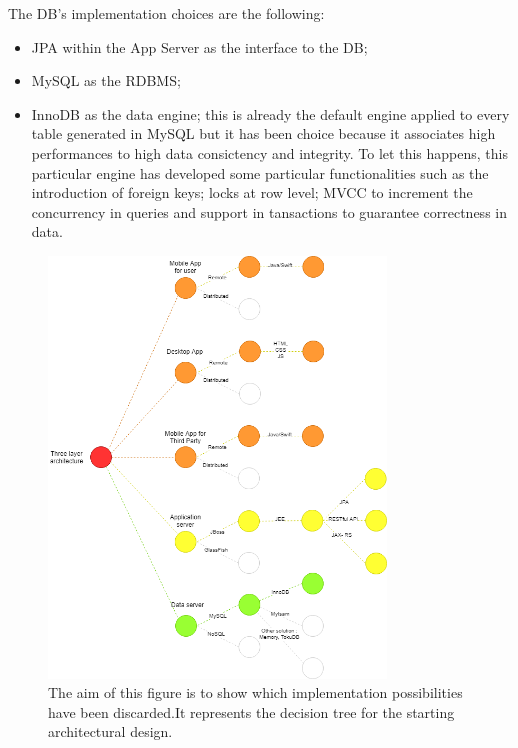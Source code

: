 The DB's implementation choices are the following:
\begin{itemize}
	\item JPA within the App Server as the interface to the DB;
	\item MySQL as the RDBMS;
	\item InnoDB as the data engine; this is already the default engine applied to every table generated in MySQL but it has been 			choice because it associates high performances to high data consictency and integrity. To let this happens, this particular 			engine has developed some particular functionalities such as the introduction of foreign keys; locks at row level; MVCC to 			increment the concurrency in queries and support in tansactions to guarantee correctness in data.
\end{itemize}

\begin{figure}[h!]
	\includegraphics[width=0.80\textwidth]{./pictures/choice_diagram.png}\par
	\caption{The aim of this figure is to show which implementation possibilities have been discarded.It represents the decision 			tree for the starting architectural design. }
\end{figure}
\FloatBarrier
